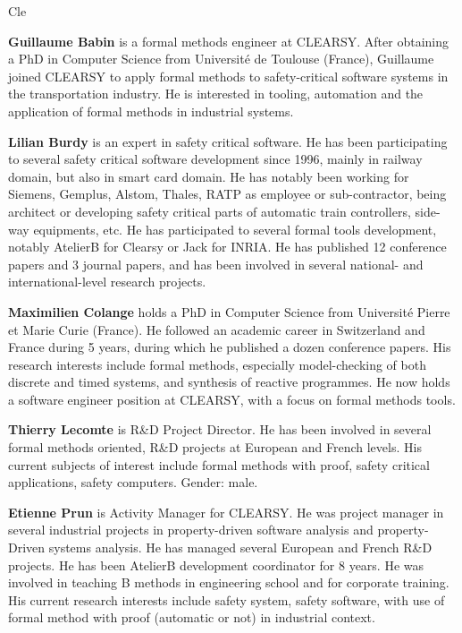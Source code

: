 \begin{sitedescription}{Cle}
\begin{compactitem}
\item\textbf{Guillaume Babin} is a formal methods engineer at CLEARSY. After obtaining a PhD in Computer Science from Université de 
Toulouse (France), Guillaume joined CLEARSY to apply formal methods to safety-critical software systems in the transportation industry. 
He is interested in tooling, automation and the application of formal methods in industrial systems.

\item\textbf{Lilian Burdy} is an expert in safety critical software. He has been participating to several safety critical software 
development since 1996, mainly in railway domain, but also in smart card domain. He has notably been working for Siemens, Gemplus, 
Alstom, Thales, RATP as employee or sub-contractor, being architect or developing safety critical parts of automatic train controllers, 
side-way equipments, etc. He has participated to several formal tools development, notably AtelierB for Clearsy or Jack for INRIA. He 
has published 12 conference papers and 3 journal papers, and has been involved in several national- and international-level research 
projects.

\item\textbf{Maximilien Colange} holds a PhD in Computer Science from Université Pierre et Marie Curie (France). He followed an 
academic career in Switzerland and France during 5 years, during which he published a dozen conference papers. His research interests
include formal methods, especially model-checking of both discrete and timed systems, and synthesis of reactive programmes. He now holds 
a software engineer position at CLEARSY, with a focus on formal methods tools.

\item\textbf{Thierry Lecomte} is R\&D Project Director. He has been involved in several formal methods oriented, R\&D projects at European 
and French levels. His current subjects of interest include formal methods with proof, safety critical applications, safety computers. 
Gender: male.

\item\textbf{Etienne Prun} is Activity Manager for CLEARSY. He was project manager in several industrial projects in property-driven 
software analysis and property-Driven systems analysis. He has managed several European and French R\&D projects. He has been AtelierB 
development coordinator for 8 years. He was involved in teaching B methods in engineering school and for corporate training. His current 
research interests include safety system, safety software, with use of formal method with proof (automatic or not) in industrial 
context.


\end{compactitem}
\end{sitedescription}
